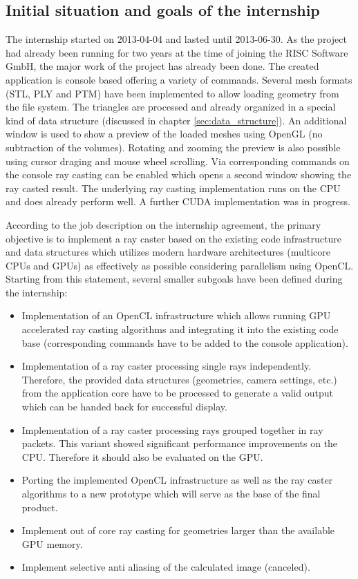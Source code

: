 \subsection{Initial situation and goals of the internship}
\label{sec:goals}

The internship started on 2013-04-04 and lasted until 2013-06-30. As the project had already been running for two years at the time of joining the RISC Software GmbH, the major work of the project has already been done. The created application is console based offering a variety of commands. Several mesh formats (STL, PLY and PTM) have been implemented to allow loading geometry from the file system. The triangles are processed and already organized in a special kind of data structure (discussed in chapter \ref{sec:data_structure}). An additional window is used to show a preview of the loaded meshes using OpenGL (no subtraction of the volumes). Rotating and zooming the preview is also possible using cursor draging and mouse wheel scrolling. Via corresponding commands on the console ray casting can be enabled which opens a second window showing the ray casted result. The underlying ray casting implementation runs on the CPU and does already perform well. A further CUDA implementation was in progress.

According to the job description on the internship agreement, the primary objective is to implement a ray caster based on the existing code infrastructure and data structures which utilizes modern hardware architectures (multicore CPUs and GPUs) as effectively as possible considering parallelism using OpenCL. Starting from this statement, several smaller subgoals have been defined during the internship:

\begin{itemize}
	\item Implementation of an OpenCL infrastructure which allows running GPU accelerated ray casting algorithms and integrating it into the existing code base (corresponding commands have to be added to the console application).
	\item Implementation of a ray caster processing single rays independently. Therefore, the provided data structures (geometries, camera settings, etc.) from the application core have to be processed to generate a valid output which can be handed back for successful display.
	\item Implementation of a ray caster processing rays grouped together in ray packets. This variant showed significant performance improvements on the CPU. Therefore it should also be evaluated on the GPU.
	\item Porting the implemented OpenCL infrastructure as well as the ray caster algorithms to a new prototype which will serve as the base of the final product.
	\item Implement out of core ray casting for geometries larger than the available GPU memory.
	\item Implement selective anti aliasing of the calculated image (canceled).
\end{itemize}



